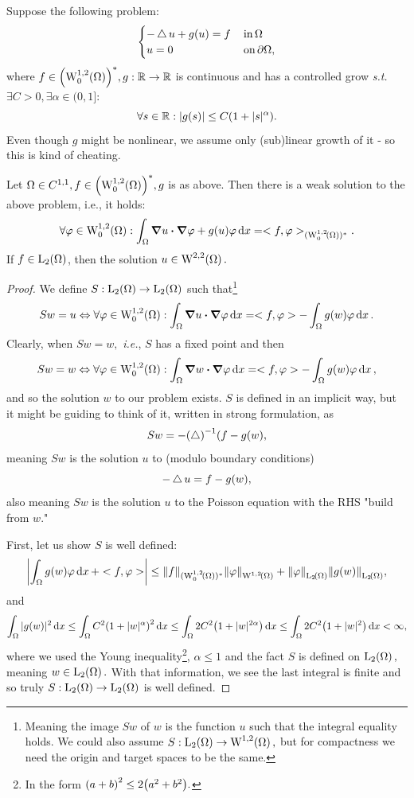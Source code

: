 \documentclass{article}
\begin{document}
\begin{example}
	Suppose the following problem: 
	\[
		\begin{cases}
			-\operatorname{\bigtriangleup} u + g(u) = f & \, \text{in} \, \Omega\\
			u = 0 & \, \text{on} \, \partial \Omega,
		\end{cases}
	\]
	where $f \in \qty(\WkpzeroSet[1][2]{\Omega})^{*}, g: \R \to \R$ is continuous and has a controlled grow \textit{s.t.} $\exists C>0, \exists \alpha \in (0,1]$:
	\[
		\forall s \in {\mathbb R}: |g(s)|\leq C\qty(1+|s|^{\alpha}).
	\]
	Even though $g$ might be nonlinear, we assume only (sub)linear growth of it - so this is kind of cheating.

	\begin{theorem}[Existence]
		Let $ \Omega \in C^{1,1}, f \in \qty(\WkpzeroSet[1][2]{\Omega})^{*}, g$ is as above. Then there is a weak solution to the above problem, i.e., it holds:
		\[
			\forall \varphi \in \WkpzeroSet[1][2]{\Omega}: \int_{\Omega}\grad u \vdot \grad \varphi + g(u) \varphi\dd{x} = <f,\varphi>_{(\WkpzeroSet[1][2]{\Omega})^{*}}.
		\]
		If $f \in \LpSet[2]{\Omega}$, then the solution $u \in \WkpSet[2][2]{\Omega}.$
	\end{theorem}
	\begin{proof}
		We define $S: \LpSet[2]{\Omega} \to \LpSet[2]{\Omega}$ such that\footnote{Meaning the image $Sw$ of $w$ is the function $u$ such that the integral equality holds. We could also assume $S: \LpSet[2]{\Omega} \to \WkpSet[1][2]{\Omega},$ but for compactness we need the origin and target spaces to be the same.}
		\[
			Sw = u \Leftrightarrow \forall \varphi \in \WkpzeroSet[1][2]{\Omega}: \int_{\Omega}\grad u \vdot \grad \varphi\dd{x} = <f,\varphi> - \int_{\Omega}g(w) \varphi\dd{x}.
		\]
		Clearly, when $Sw = w,$ \textit{i.e.}, $S$ has a fixed point and then
		\[
			Sw = w \Leftrightarrow \forall \varphi \in \WkpzeroSet[1][2]{\Omega}: \int_{\Omega}\grad w \vdot \grad \varphi \dd{x} = <f, \varphi> - \int_{\Omega}g(w) \varphi\dd{x},
		\]
		and so the solution $w$ to our problem exists. $S$ is defined in an implicit way, but it might be guiding to think of it, written in strong formulation, as
		\[
			Sw = -\qty(\operatorname{\bigtriangleup})^{-1}(f - g(w),
		\]
		meaning $Sw$ is the solution $u$ to (modulo boundary conditions)
		\[
			-\operatorname{\bigtriangleup} u = f- g(w),
		\]
		also meaning $Sw$ is the solution $u$ to the Poisson equation with the RHS "build from $w$."

		First, let us show $S$ is well defined:
		\[
			\abs{\int_{\Omega}g(w) \varphi\dd{x} + <f, \varphi>} \leq \norm{f}_{(\WkpzeroSet[1][2]{\Omega})^{*}} \norm{\varphi}_{\WkpSet[1][2]{\Omega}} + \norm{\varphi}_{\LpSet[2]{\Omega}} \norm{g(w)}_{\LpSet[2]{\Omega}},
		\] and
		\[
			\int_{\Omega}|g(w)|^{2}\dd{x} \leq \int_{\Omega}C^{2}\qty(1+|w|^{\alpha})^{2}\dd{x} \leq \int_{\Omega}2C^{2}\qty(1+|w|^{2 \alpha})\dd{x} \leq \int_{\Omega}2C^{2}\qty(1+|w|^2)\dd{x} < \infty,
		\]
		where we used the Young inequality\footnote{In the form $\qty(a+b)^{2} \leq 2\qty(a^{2}+b^{2}).$}, $\alpha \leq 1$ and the fact $S$ is defined on $\LpSet[2]{\Omega},$ meaning $w \in \LpSet[2]{\Omega}.$ With that information, we see the last integral is finite and so truly $S: \LpSet[2]{\Omega} \to \LpSet[2]{\Omega}$ is well defined.


\end{proof}
\end{example}
\end{document}
